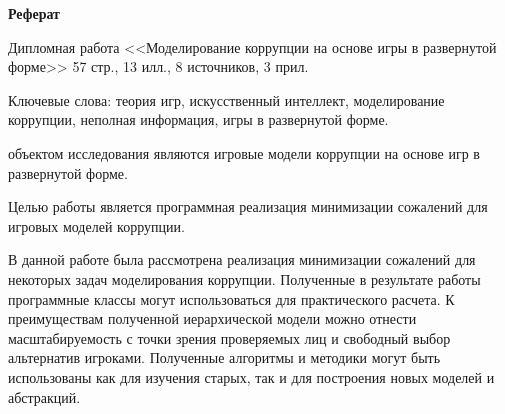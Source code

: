 \begin{center}
	{\large \textbf{Реферат}}
\end{center}
\par
Дипломная работа <<Моделирование коррупции на основе игры в развернутой форме>> 57 стр., 13 илл., 8 источников, 3 прил.
\par
Ключевые слова: теория игр, искусственный интеллект, моделирование коррупции, неполная информация, игры в развернутой форме.
\par
объектом исследования являются игровые модели коррупции на основе игр в развернутой форме.
\par
Целью работы является программная реализация минимизации сожалений для игровых моделей коррупции.
\par 
В данной работе была рассмотрена реализация минимизации сожалений для некоторых задач моделирования коррупции.
Полученные в результате работы программные классы могут использоваться для практического расчета. К преимуществам полученной иерархической модели можно отнести масштабируемость с точки зрения проверяемых лиц и свободный выбор альтернатив игроками. Полученные алгоритмы и методики могут быть использованы как для изучения старых, так и для построения новых моделей и абстракций.
